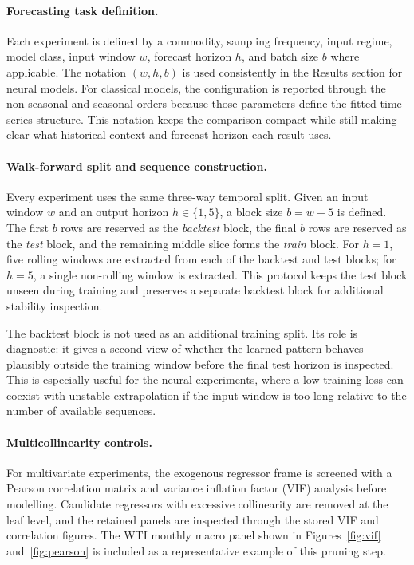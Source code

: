 \documentclass[11pt,a4paper]{article}
\begin{document}
\paragraph{Forecasting task definition.} Each experiment is defined by a commodity, sampling frequency, input regime, model class, input window $w$, forecast horizon $h$, and batch size $b$ where applicable. The notation $(w,h,b)$ is used consistently in the Results section for neural models. For classical models, the configuration is reported through the non-seasonal and seasonal orders because those parameters define the fitted time-series structure. This notation keeps the comparison compact while still making clear what historical context and forecast horizon each result uses.

\paragraph{Walk-forward split and sequence construction.}\label{sec:protocol}
Every experiment uses the same three-way temporal split. Given an input window $w$ and an output horizon $h \in \{1, 5\}$, a block size $b = w + 5$ is defined. The first $b$ rows are reserved as the \emph{backtest} block, the final $b$ rows are reserved as the \emph{test} block, and the remaining middle slice forms the \emph{train} block. For $h=1$, five rolling windows are extracted from each of the backtest and test blocks; for $h=5$, a single non-rolling window is extracted. This protocol keeps the test block unseen during training and preserves a separate backtest block for additional stability inspection.

The backtest block is not used as an additional training split. Its role is diagnostic: it gives a second view of whether the learned pattern behaves plausibly outside the training window before the final test horizon is inspected. This is especially useful for the neural experiments, where a low training loss can coexist with unstable extrapolation if the input window is too long relative to the number of available sequences.

\paragraph{Multicollinearity controls.}\label{sec:multicol}
For multivariate experiments, the exogenous regressor frame is screened with a Pearson correlation matrix and variance inflation factor (VIF) analysis before modelling. Candidate regressors with excessive collinearity are removed at the leaf level, and the retained panels are inspected through the stored VIF and correlation figures. The WTI monthly macro panel shown in Figures~\ref{fig:vif} and~\ref{fig:pearson} is included as a representative example of this pruning step.
\end{document}
